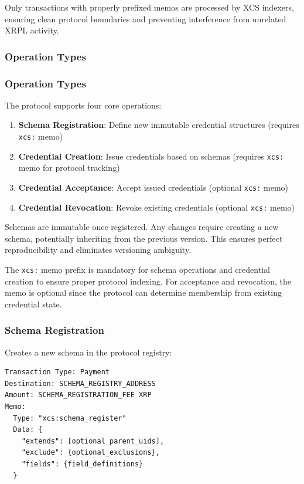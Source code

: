 \documentclass[11pt,a4paper]{article}
\begin{document}
Only transactions with properly prefixed memos are processed by XCS indexers, ensuring clean protocol boundaries and preventing interference from unrelated XRPL activity.


\subsubsection{Operation Types}

\subsubsection{Operation Types}

The protocol supports four core operations:

\begin{enumerate}
    \item \textbf{Schema Registration}: Define new immutable credential structures (requires \texttt{xcs:} memo)
    \item \textbf{Credential Creation}: Issue credentials based on schemas (requires \texttt{xcs:} memo for protocol tracking)
    \item \textbf{Credential Acceptance}: Accept issued credentials (optional \texttt{xcs:} memo)
    \item \textbf{Credential Revocation}: Revoke existing credentials (optional \texttt{xcs:} memo)
\end{enumerate}

Schemas are immutable once registered. Any changes require creating a new schema, potentially inheriting from the previous version. This ensures perfect reproducibility and eliminates versioning ambiguity.

The \texttt{xcs:} memo prefix is mandatory for schema operations and credential creation to ensure proper protocol indexing. For acceptance and revocation, the memo is optional since the protocol can determine membership from existing credential state.

\subsubsection{Schema Registration}

Creates a new schema in the protocol registry:

\begin{lstlisting}[caption={Schema Registration Transaction}]
Transaction Type: Payment
Destination: SCHEMA_REGISTRY_ADDRESS
Amount: SCHEMA_REGISTRATION_FEE XRP
Memo:
  Type: "xcs:schema_register"
  Data: {
    "extends": [optional_parent_uids],
    "exclude": {optional_exclusions},
    "fields": {field_definitions}
  }
\end{lstlisting}
\end{document}
